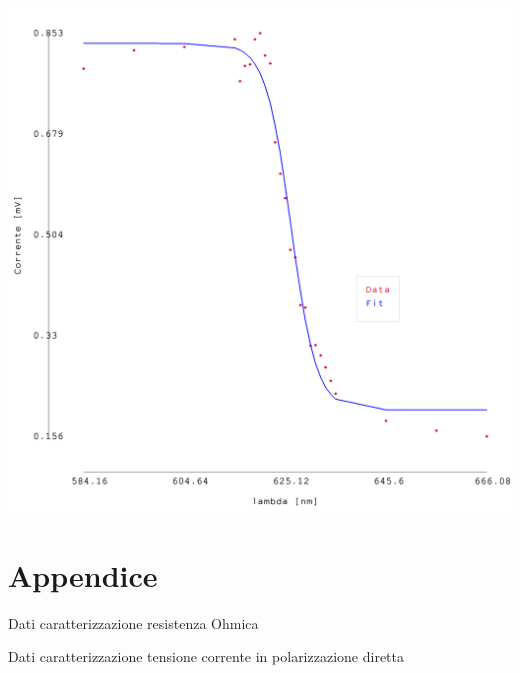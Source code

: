 \documentclass{article}
\begin{document}
\begin{center}
\begin{minipage}{0.25\textwidth}
    \end{minipage}
    \hfill
    \begin{minipage}{0.25\textwidth}        
        \includegraphics[width=1\linewidth]{../images/grafico2_4.png}
    \end{minipage}
\end{center}

\newpage

\section{Appendice}

\begin{table}[htbp]
    \centering
    
    \caption{Dati caratterizzazione resistenza Ohmica}
    \label{tab:tabella1}
\end{table}

\begin{table}[htbp]
    \centering
    
    \caption{Dati caratterizzazione tensione corrente in polarizzazione diretta}
    \label{tab:tabella2}
\end{table}
\end{document}
